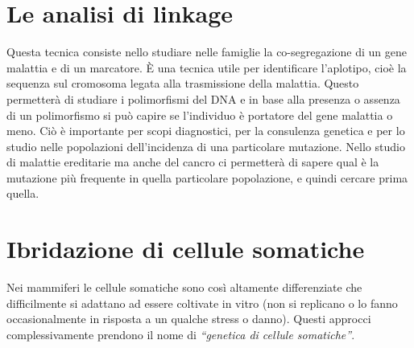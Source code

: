 \documentclass[11pt]{book}
\begin{document}
\section{Le analisi di linkage}
Questa tecnica consiste nello studiare nelle famiglie la co-segregazione di un gene malattia e di un marcatore. È una tecnica utile per identificare l’aplotipo, cioè la sequenza sul cromosoma legata alla trasmissione della malattia. Questo permetterà di studiare i polimorfismi del DNA e in base alla presenza o assenza di un polimorfismo si può capire se l’individuo è portatore del gene malattia o meno. Ciò è importante per scopi diagnostici, per la consulenza genetica e per lo studio nelle popolazioni dell’incidenza di una particolare mutazione. Nello studio di malattie ereditarie ma anche del cancro ci permetterà di sapere qual è la mutazione più frequente in quella particolare popolazione, e quindi cercare prima quella.

\section{Ibridazione di cellule somatiche} 
Nei mammiferi le cellule somatiche sono così altamente differenziate che difficilmente si adattano ad essere coltivate in vitro (non si replicano o lo fanno occasionalmente in risposta a un qualche stress o danno). Questi approcci complessivamente prendono il nome di \emph{``genetica di cellule somatiche''}.
\end{document}
